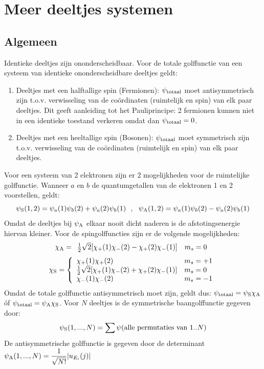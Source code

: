 \documentclass[twoside]{report}
\begin{document}
\section[~~Meer deeltjes systemen]{Meer deeltjes systemen}
\subsection[~~Algemeen]{Algemeen}
Identieke deeltjes zijn ononderscheidbaar. Voor de totale golffunctie van een
systeem van identieke ononderscheidbare deeltjes geldt:
\begin{enumerate}
\item Deeltjes met een halftallige spin (Fermionen): $\psi_{\rm totaal}$
      moet antisymmetrisch zijn t.o.v. verwisseling van de co\"ordinaten
      (ruimtelijk en spin) van elk paar deeltjes. Dit geeft aanleiding tot
      het Pauliprincipe: 2 fermionen kunnen niet in een identieke
      toestand verkeren omdat dan $\psi_{\rm totaal}=0$.
\item Deeltjes met een heeltallige spin (Bosonen): $\psi_{\rm totaal}$
      moet symmetrisch zijn t.o.v. verwisseling van de co\"ordinaten
      (ruimtelijk en spin) van elk paar deeltjes.
\end{enumerate}
Voor een systeem van 2 elektronen zijn er 2 mogelijkheden voor de
ruimtelijke golffunctie. Wanneer $a$ en $b$ de quantumgetallen van de
elektronen 1 en 2 voorstellen, geldt:
\[
\psi_{\rm S}(1,2)=\psi_a(1)\psi_b(2)+\psi_a(2)\psi_b(1)~~,~~
\psi_{\rm A}(1,2)=\psi_a(1)\psi_b(2)-\psi_a(2)\psi_b(1)
\]
Omdat de deeltjes bij $\psi_{\rm A}$ elkaar nooit dicht naderen is de
afstotingsenergie hiervan kleiner. Voor de spingolffuncties zijn er de
volgende mogelijkheden:
\[
\chi_{\rm A}=
\begin{array}{ll}
\mbox{$\frac{1}{2}$}\sqrt{2}[\chi_+(1)\chi_-(2)-\chi_+(2)\chi_-(1)]&m_s=0
\end{array}
\]
\[
\chi_{\rm S}=
\left\{\begin{array}{ll}
\chi_+(1)\chi_+(2)&m_s=+1\\
\mbox{$\frac{1}{2}$}\sqrt{2}[\chi_+(1)\chi_-(2)+\chi_+(2)\chi_-(1)]&m_s=0\\
\chi_-(1)\chi_-(2)&m_s=-1
\end{array}\right.
\]
Omdat de totale golffunctie antisymmetrisch moet zijn, geldt dus:
$\psi_{\rm totaal}=\psi_{\rm S}\chi_{\rm A}$ \'of
$\psi_{\rm totaal}=\psi_{\rm A}\chi_{\rm S}$.
\npar
Voor $N$ deeltjes is de symmetrische baangolffunctie gegeven door:
\[
\psi_{\rm S}(1,...,N)=\sum\psi(\mbox{alle permutaties van }1..N)
\]
De antisymmetrische golffunctie is gegeven door de determinant
$\displaystyle\psi_{\rm A}(1,...,N)=\frac{1}{\sqrt{N!}}|u_{E_i}(j)|$
\end{document}
